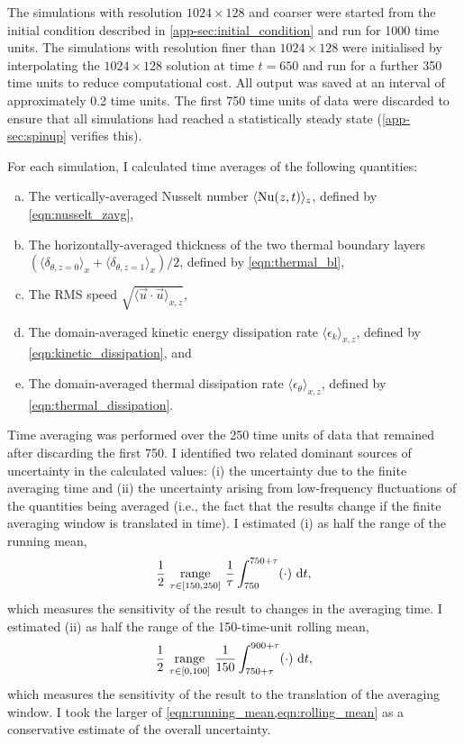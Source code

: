 \documentclass[../main.tex]{subfiles}
\begin{document}
The simulations with resolution $1024 \times 128$ and coarser were started from
the initial condition described in \cref{app-sec:initial_condition} and run for
1000 time units. The simulations with resolution finer than $1024 \times 128$
were initialised by interpolating the $1024 \times 128$ solution at time $t =
650$ and run for a further 350 time units to reduce computational cost. All
output was saved at an interval of approximately 0.2 time units. The first 750
time units of data were discarded to ensure that all simulations had reached a
statistically steady state (\cref{app-sec:spinup} verifies this).

For each simulation, I calculated time averages of the following quantities:
\begin{enumerate}[a.]
    \item The vertically-averaged Nusselt number
        $\langle \mathrm{Nu}(z,t) \rangle _z$, defined by \cref{eqn:nusselt_zavg},
    \item The horizontally-averaged thickness of the two thermal boundary
        layers $( \langle \delta_{\theta, z=0} \rangle _x
        + \langle \delta_{\theta, z=1} \rangle _x )/2$, defined by
        \cref{eqn:thermal_bl},
    \item The RMS speed $\sqrt{\langle \vec{u} \cdot \vec{u} \rangle _{x,z}}$,
    \item The domain-averaged kinetic energy dissipation rate $\langle
        \epsilon_k \rangle _{x,z}$, defined by \cref{eqn:kinetic_dissipation},
        and
    \item The domain-averaged thermal dissipation rate $\langle \epsilon_\theta
        \rangle _{x,z}$, defined by \cref{eqn:thermal_dissipation}.
\end{enumerate}

Time averaging was performed over the 250 time units of data that remained
after discarding the first 750. I identified two related dominant sources of
uncertainty in the calculated values: (i) the uncertainty due to the finite
averaging time and (ii) the uncertainty arising from low-frequency fluctuations
of the quantities being averaged (i.e., the fact that the results change if the
finite averaging window is translated in time). I estimated (i) as half the
range of the running mean,
\begin{equation} \label{eqn:running_mean}
    \frac{1}{2} ~ \underset{\tau \in [150, 250]}{\operatorname{range}} ~
        \frac{1}{\tau} \int_{750}^{750 + \tau} (\cdot) ~\mathrm{d}t,
\end{equation}
which measures the sensitivity of the result to changes in the averaging time.
I estimated (ii) as half the range of the 150-time-unit rolling mean,
\begin{equation} \label{eqn:rolling_mean}
    \frac{1}{2} ~ \underset{\tau \in [0, 100]}{\operatorname{range}} ~
        \frac{1}{150} \int_{750 + \tau}^{900 + \tau} (\cdot) ~\mathrm{d}t,
\end{equation}
which measures the sensitivity of the result to the translation of the
averaging window. I took the larger of \cref{eqn:running_mean,eqn:rolling_mean}
as a conservative estimate of the overall uncertainty.
\end{document}
